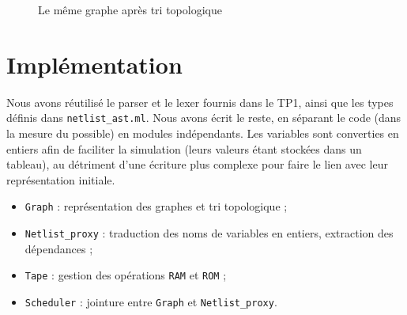 \documentclass[a4paper]{article}
\begin{document}
\begin{figure}[h]
    \centering
{}
\caption{Le même graphe après tri topologique}
\end{figure}


\section{Implémentation}

Nous avons réutilisé le parser et le lexer fournis dans le TP1, ainsi que les types définis dans \texttt{netlist\_ast.ml}.
Nous avons écrit le reste, en séparant le code (dans la mesure du possible) en modules indépendants.
Les variables sont converties en entiers afin de faciliter la simulation (leurs valeurs étant stockées dans un tableau), au détriment d'une écriture plus complexe pour faire le lien avec leur représentation initiale.
\begin{itemize}
    \item \texttt{Graph} : représentation des graphes et tri topologique ;
    \item \texttt{Netlist\_proxy} : traduction des noms de variables en entiers, extraction des dépendances ;
    \item \texttt{Tape} : gestion des opérations \texttt{RAM} et \texttt{ROM} ;
    \item \texttt{Scheduler} : jointure entre \texttt{Graph} et \texttt{Netlist\_proxy}.
\end{itemize}
\end{document}

